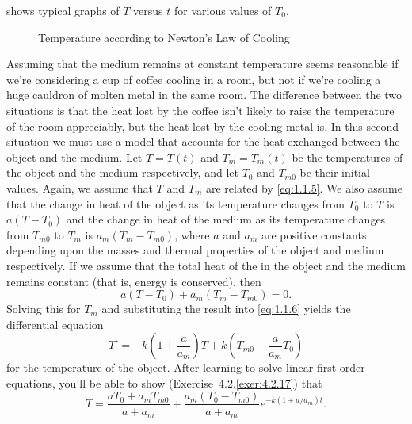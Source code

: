  shows typical graphs of $T$ versus $t$ for
various values of  $T_0$.

\begin{figure}
  \centering
  \caption{Temperature according to Newton's Law of Cooling}
  \label{figure:1.1.2}
\end{figure}

Assuming that the medium remains at constant temperature seems
reasonable if we're considering a cup of coffee cooling in a room, but
 not if we're cooling a huge cauldron of molten
metal in the same room. The difference between the two situations is
that the heat lost by the coffee isn't likely to raise the
temperature of the room appreciably, but the heat lost by the
cooling metal is. In this second situation we must use a model that
accounts for the heat exchanged between the object and the medium. Let
$T=T(t)$ and $T_m=T_m(t)$ be the temperatures of the object and the
medium respectively, and let $T_0$ and $T_{m0}$ be their initial
values. Again, we assume that $T$ and $T_m$ are related by
\eqref{eq:1.1.5}. We also assume that the change in heat of
the object as its temperature changes from $T_0$ to $T$ is $a(T-T_0)$
and  the change in heat of the medium as its temperature changes
from $T_{m0}$ to $T_m$ is $a_m(T_m-T_{m0})$, where $a$ and $a_m$ are
positive constants depending upon the masses and thermal properties of
the object and medium respectively. If we assume that the total heat
of the in the object and the medium remains constant
(that is, energy is conserved), then
\[
a(T-T_0)+a_m(T_m-T_{m0})=0.
\]
Solving this for  $T_m$  and substituting the result into
\eqref{eq:1.1.6} yields the differential equation
\[
T'=-k\left(1+\frac{a}{a_m}\right)T
+k\left(T_{m0}+\frac{a}{a_m}T_0\right)
\]
for the temperature of the object.  After learning to solve linear
first order  equations, you'll be able to show
({Exercise~4.2.\ref{exer:4.2.17}}) that
\[
T=\frac{aT_0+a_mT_{m0}}{a+a_m}+\frac{a_m(T_0-T_{m0})}{a+a_m}e^{-k(1+a/a_m)t}.
\]

